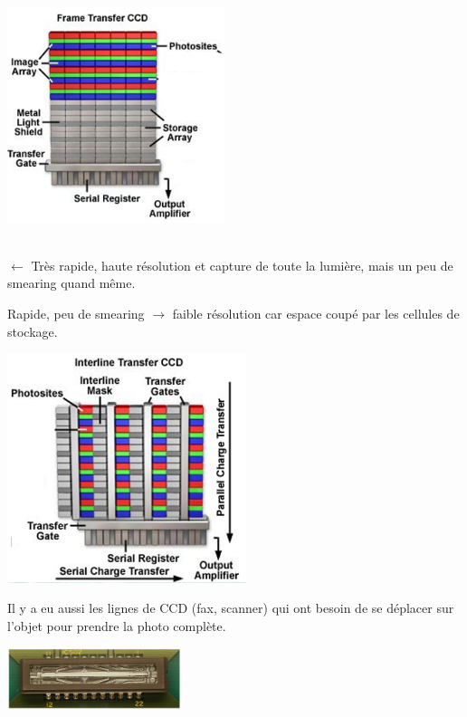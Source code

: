 \documentclass[letterpaper, 12pt]{article}
\newcommand{\alinea}{
\hspace*{0.5cm}}
\begin{document}
		\begin{center}
			\begin{minipage}{0.33\textwidth}
				\includegraphics[width=2.5in]{Images/ccd2} \hfill 
			\end{minipage}
			\begin{minipage}{0.33\textwidth}
				\begin{flushleft}
				~\\
				$\leftarrow$ Très rapide, haute résolution et capture de toute la lumière, mais un peu de smearing quand même.
				\end{flushleft}
				\begin{flushright}
				 Rapide, peu de smearing $\rightarrow$
				 faible résolution car espace coupé par les cellules de stockage.	
				 \end{flushright} 
			\end{minipage}		
			\begin{minipage}{0.32\textwidth}
				\includegraphics[width=2.75in]{Images/ccd3}
			\end{minipage}
		\end{center}
		\alinea Il y a eu aussi les lignes de CCD (fax, scanner) qui ont besoin de se déplacer sur l'objet pour prendre la photo complète.
		\begin{center}
			\includegraphics[width=2in]{Images/ccd4}
		\end{center}
\end{document}
